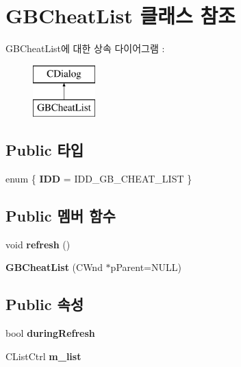 \hypertarget{class_g_b_cheat_list}{}\section{G\+B\+Cheat\+List 클래스 참조}
\label{class_g_b_cheat_list}
G\+B\+Cheat\+List에 대한 상속 다이어그램 \+: \begin{figure}[H]
\begin{center}
\leavevmode
\includegraphics[height=2.000000cm]{class_g_b_cheat_list}
\end{center}
\end{figure}
\subsection*{Public 타입}
\begin{DoxyCompactItemize}
\item 
\mbox{\label{class_g_b_cheat_list_acbd6ac83ab43510a2dcbab793ecb5fb8}} 
enum \{ {\bfseries I\+DD} = I\+D\+D\+\_\+\+G\+B\+\_\+\+C\+H\+E\+A\+T\+\_\+\+L\+I\+ST
 \}
\end{DoxyCompactItemize}
\subsection*{Public 멤버 함수}
\begin{DoxyCompactItemize}
\item 
\mbox{\label{class_g_b_cheat_list_a248cc28fa5e392d2f55d0f66ff6c5821}} 
void {\bfseries refresh} ()
\item 
\mbox{\label{class_g_b_cheat_list_a1eb2762c0143fad856fcf28086734c30}} 
{\bfseries G\+B\+Cheat\+List} (C\+Wnd $\ast$p\+Parent=N\+U\+LL)
\end{DoxyCompactItemize}
\subsection*{Public 속성}
\begin{DoxyCompactItemize}
\item 
\mbox{\label{class_g_b_cheat_list_aba5dc0a50355411fd9c82f87fbdbeb2e}} 
bool {\bfseries during\+Refresh}
\item 
\mbox{\label{class_g_b_cheat_list_aca0eaf2ff30100f5d11e4c80193ad90e}} 
C\+List\+Ctrl {\bfseries m\+\_\+list}
\end{DoxyCompactItemize}
